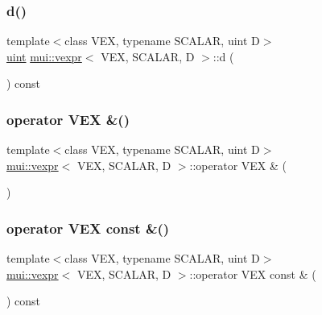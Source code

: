 \subsubsection{\texorpdfstring{d()}{d()}}
{\footnotesize\ttfamily template$<$class V\+EX, typename S\+C\+A\+L\+AR, uint D$>$ \\
\hyperlink{namespacemui_af15a3e7188a2117fb9965277bb0cacd2}{uint} \hyperlink{structmui_1_1vexpr}{mui\+::vexpr}$<$ V\+EX, S\+C\+A\+L\+AR, D $>$\+::d (\begin{DoxyParamCaption}{ }\end{DoxyParamCaption}) const\hspace{0.3cm}{\ttfamily [inline]}}

\mbox{\label{structmui_1_1vexpr_a75b45ea85a172243bea2f21e61318744}} 
\subsubsection{\texorpdfstring{operator V\+E\+X \&()}{operator VEX \&()}}
{\footnotesize\ttfamily template$<$class V\+EX, typename S\+C\+A\+L\+AR, uint D$>$ \\
\hyperlink{structmui_1_1vexpr}{mui\+::vexpr}$<$ V\+EX, S\+C\+A\+L\+AR, D $>$\+::operator V\+EX \& (\begin{DoxyParamCaption}{ }\end{DoxyParamCaption})\hspace{0.3cm}{\ttfamily [inline]}}

\mbox{\label{structmui_1_1vexpr_abffa7c2afa1e707dba9565d8f6bf9fef}} 
\subsubsection{\texorpdfstring{operator V\+E\+X const \&()}{operator VEX const \&()}}
{\footnotesize\ttfamily template$<$class V\+EX, typename S\+C\+A\+L\+AR, uint D$>$ \\
\hyperlink{structmui_1_1vexpr}{mui\+::vexpr}$<$ V\+EX, S\+C\+A\+L\+AR, D $>$\+::operator V\+EX const \& (\begin{DoxyParamCaption}{ }\end{DoxyParamCaption}) const\hspace{0.3cm}{\ttfamily [inline]}}

